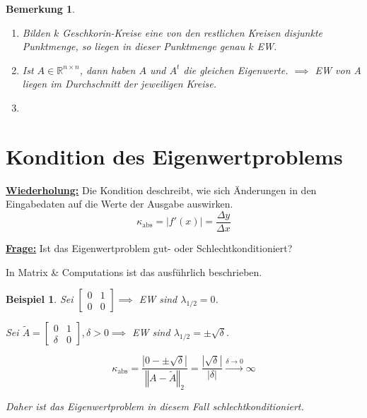\documentclass{book}
\newtheorem{remark}[algorithm]{Bemerkung}
\newtheorem{example}[algorithm]{Beispiel}
\def\R{\mathbb{R}}
\begin{document}
            \begin{remark}\label{b4.8}
                \begin{enumerate}
                    \item Bilden $k$ Geschkorin-Kreise eine von den restlichen Kreisen disjunkte 
                    Punktmenge, so liegen in dieser Punktmenge genau $k$ EW.
                    \item Ist $A\in\R^{n\times n}$, dann haben $A$ und $A^t$ die gleichen Eigenwerte. 
                    $\implies$ EW von A liegen im Durchschnitt der jeweiligen Kreise.
                    \item 
                \end{enumerate}
            \end{remark}

        \section{Kondition des Eigenwertproblems}

            \underline{\textbf{Wiederholung:}} Die Kondition deschreibt, wie sich Änderungen in den
            Eingabedaten auf die Werte der Ausgabe auswirken. 
            \[
                \kappa_{\text{abs}}=\left\vert f'(x) \right\vert = \frac{\Delta y}{\Delta x}    
            \]

            \underline{\textbf{Frage:}} Ist das Eigenwertproblem gut- oder Schlechtkonditioniert?

            \begin{tcolorbox}[enhanced,breakable,
            title=Kondition des Problems]
            In Matrix \& Computations ist das ausführlich beschrieben. 
            \end{tcolorbox}
            

            \begin{example}\label{b4.9}
                Sei $\begin{bmatrix}
                    0 &1\\ 0&0
                \end{bmatrix}\implies $ EW sind $\lambda_{1/2}=0$.

                Sei $\tilde{A}=\begin{bmatrix}
                    0 & 1 \\ \delta & 0
                \end{bmatrix},\delta>0 \implies $ EW sind $\lambda_{1/2}=\pm\sqrt{\delta}$.

                \begin{equation*}
                    \kappa_{\text{abs}}=\frac{\left\vert 0-\pm\sqrt{\delta} \right\vert}{\left\Vert A-\tilde{A} \right\Vert_2} = \frac{\left\vert \sqrt{\delta} \right\vert}{\left\vert \delta \right\vert} \stackrel{\delta\to 0}{\to}\infty
                \end{equation*}

                Daher ist das Eigenwertproblem in diesem Fall schlechtkonditioniert.

            \end{example}
\end{document}
